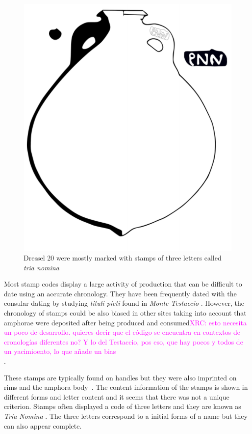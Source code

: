 \documentclass[review]{elsarticle}
\newcommand{\memo}[2]{\textcolor{#1}{#2}}
\newcommand{\xavi}[1]{\memo{magenta}{XRC: #1\\}}
\begin{document}
\begin{figure}[htp]
	\centering
\includegraphics[scale=0.5]{figs/dressel20}
\caption{Dressel 20 were mostly marked with stamps of three letters called \textit{tria nomina}}
\label{amphora}
\end{figure} 

Most stamp codes display a large activity of production that can be difficult to date using an accurate chronology. They have been frequently dated with the consular dating by studying \textit{tituli picti} found in \textit{Monte Testaccio} \citep{Testaccio1, berni_millet_epigrafianforica_2008}. However, the chronology of stamps could be also biased in other sites taking into account that amphorae were deposited after being produced and consumed\xavi{esto necesita un poco de desarrollo. quieres decir que el código se encuentra en contextos de cronologías diferentes no? Y lo del Testaccio, pos eso, que hay pocos y todos de un yacimioento, lo que añade un bias}.  

These stamps are typically found on handles but they were also imprinted on rims and the amphora body~\citep{millet_anforas_1998}. The content information of the stamps is shown in different forms and letter content and it seems that there was not a unique criterion.
Stamps often displayed a code of three letters and they are known as \textit{Tria Nomina} \citep{berni_millet_amphora_1996}. The three letters correspond to a initial forms of a name but they can also appear complete. 
\end{document}
